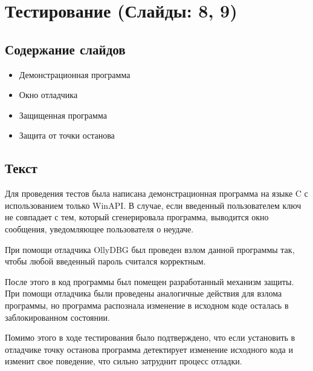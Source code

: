 
\section{Тестирование (Слайды: 8, 9)}

\subsection{Содержание слайдов}

\begin{itemize}
  \item Демонстрационная программа
  \item Окно отладчика
  \item Защищенная программа
  \item Защита от точки останова
\end{itemize}

\subsection{Текст}

Для проведения тестов была написана демонстрационная программа на языке C с
использованием только WinAPI. В случае, если введенный пользователем ключ не
совпадает с тем, который сгенерировала программа, выводится окно сообщения,
уведомляющее пользователя о неудаче.

При помощи отладчика OllyDBG был проведен взлом данной программы так, чтобы
любой введенный пароль считался корректным.

После этого в код программы был помещен разработанный механизм защиты. При
помощи отладчика были проведены аналогичные действия для взлома программы, но
программа распознала изменение в исходном коде осталась в заблокированном
состоянии.

Помимо этого в ходе тестирования было подтверждено, что если установить в
отладчике точку останова программа детектирует изменение исходного кода и
изменит свое поведение, что сильно затруднит процесс отладки.

